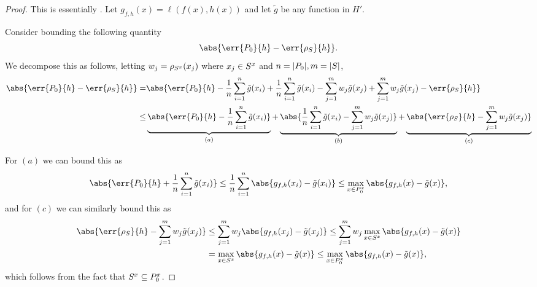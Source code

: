 \begin{proof}
  This is essentially \citep[Proof of Theorem 1]{viering17_nuclear_discr_activ_learn}.
  Let \(g_{f, h}(x) = \ell(f(x), h(x))\) and let \(\tilde{g}\) be any function in
  \(H'\).

  Consider bounding the following quantity
  \begin{equation*}
    \abs{\err{\poolset_0}{h} - \err{\rho_{\trainset}}{h}}.
  \end{equation*}
  We decompose this as follows, letting \(w_{j} = \rho_{S^x}(x_j)\) where
  \(x_j \in S^x\) and \(n = |P_0|, m = |S|\),
  \begin{align*}
    \abs{\err{\poolset_0}{h} - \err{\rho_{\trainset}}{h}} = & \abs{\err{\poolset_0}{h} - \frac{1}{n} \sum_{i=1}^n\tilde{g}(x_i) + \frac{1}{n} \sum_{i=1}^n\tilde{g}(x_i) - \sum_{j=1}^m w_j \tilde{g}(x_j) + \sum_{j=1}^m w_j \tilde{g}(x_j) - \err{\rho_{\trainset}}{h}} \\
    \leq & \underbrace{\abs{\err{\poolset_0}{h} - \frac{1}{n} \sum_{i=1}^n\tilde{g}(x_i)}}_{(a)} + \underbrace{\abs{\frac{1}{n} \sum_{i=1}^n\tilde{g}(x_i) - \sum_{j=1}^m w_j \tilde{g}(x_j)}}_{(b)} + \underbrace{\abs{\err{\rho_{\trainset}}{h} - \sum_{j=1}^m w_j \tilde{g}(x_j)}}_{(c)}
  \end{align*}

  For \((a)\) we can bound this as
  \begin{equation*}
    \abs{\err{\poolset_0}{h} + \frac{1}{n} \sum_{i=1}^n\tilde{g}(x_i)} \leq \frac{1}{n} \sum_{i=1}^{n}\abs{g_{f, h}(x_{i}) - \tilde{g}(x_{i})} \leq \max_{x \in \poolsetx_0}\abs{g_{f, h}(x) - \tilde{g}(x)},
  \end{equation*}
  and for \((c)\) we can similarly bound this as
  \begin{align*}
    \abs{\err{\rho_{\trainset}}{h} - \sum_{j=1}^m w_j \tilde{g}(x_j)} & \leq \sum_{j=1}^{m} w_{j}\abs{g_{f, h}(x_{j}) - \tilde{g}(x_{j})} \leq \sum_{j=1}^{m}w_{j}\max_{x \in \trainsetx}\abs{g_{f, h}(x) - \tilde{g}(x)} \\
                                                                      & = \max_{x \in \trainsetx}\abs{g_{f, h}(x) - \tilde{g}(x)} \leq \max_{x \in \poolsetx_0}\abs{g_{f, h}(x) - \tilde{g}(x)},
  \end{align*}
  which follows from the fact that \(S^x \subseteq P^x_{0}\).


\end{proof}
